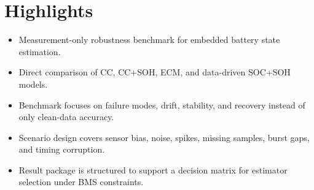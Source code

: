 \documentclass[12pt]{article}
\begin{document}
\section*{Highlights}
\begin{itemize}
    \item Measurement-only robustness benchmark for embedded battery state estimation.
    \item Direct comparison of CC, CC+SOH, ECM, and data-driven SOC+SOH models.
    \item Benchmark focuses on failure modes, drift, stability, and recovery instead of only clean-data accuracy.
    \item Scenario design covers sensor bias, noise, spikes, missing samples, burst gaps, and timing corruption.
    \item Result package is structured to support a decision matrix for estimator selection under BMS constraints.
\end{itemize}
\end{document}
